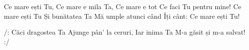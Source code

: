 \beginverse
Ce mare ești Tu,
Ce mare e mila Ta,
Ce mare e tot
Ce faci Tu pentru mine!
Ce mare ești Tu
Și bunătatea Ta
Mă umple atunci când Îți cânt:
Ce mare ești Tu!
\endverse

\beginchorus
/: Căci dragostea Ta
Ajunge pân’ la ceruri,
Iar inima Ta
M-a găsit și m-a salvat! :/
\endchorus
\endsong